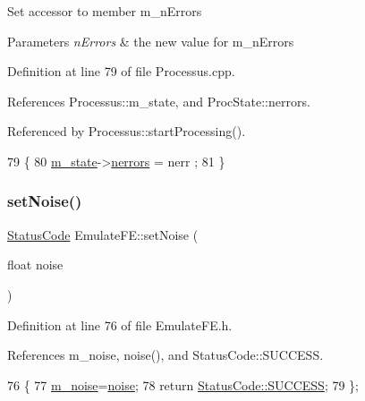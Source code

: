 Set accessor to member m\+\_\+n\+Errors 
\begin{DoxyParams}{Parameters}
{\em n\+Errors} & the new value for m\+\_\+n\+Errors \\
\hline
\end{DoxyParams}


Definition at line 79 of file Processus.\+cpp.



References Processus\+::m\+\_\+state, and Proc\+State\+::nerrors.



Referenced by Processus\+::start\+Processing().


\begin{DoxyCode}
79                                              \{
80   \hyperlink{classProcessus_ab3539eee42891ceae0baf4395ae7fb61}{m\_state}->\hyperlink{structProcState_a51a0f54ba62b07e07ac8518c5f32828d}{nerrors} = nerr ;
81 \}
\end{DoxyCode}
\mbox{\label{classEmulateFE_a9b1d0d30631d304fc615c064db8231ca}} 
\subsubsection{\texorpdfstring{set\+Noise()}{setNoise()}}
{\footnotesize\ttfamily \hyperlink{classStatusCode}{Status\+Code} Emulate\+F\+E\+::set\+Noise (\begin{DoxyParamCaption}\item[{float}]{noise }\end{DoxyParamCaption})\hspace{0.3cm}{\ttfamily [inline]}}



Definition at line 76 of file Emulate\+F\+E.\+h.



References m\+\_\+noise, noise(), and Status\+Code\+::\+S\+U\+C\+C\+E\+SS.


\begin{DoxyCode}
76                                    \{
77     \hyperlink{classEmulateFE_a74f8720a1da5806fad3811339ef9b98f}{m\_noise}=\hyperlink{classEmulateFE_a3e1a2e88567bf16a5599a1602d6ba50d}{noise};
78     \textcolor{keywordflow}{return} \hyperlink{classStatusCode_a6f565cbeadc76d14c72f047e5e85eb4badd0da38d3ba0d922efd1f4619bc37ad8}{StatusCode::SUCCESS};
79   \};
\end{DoxyCode}
\mbox{\label{classEmulateFE_a3a8b53c47db627e5a70076968d5aab53}} 
